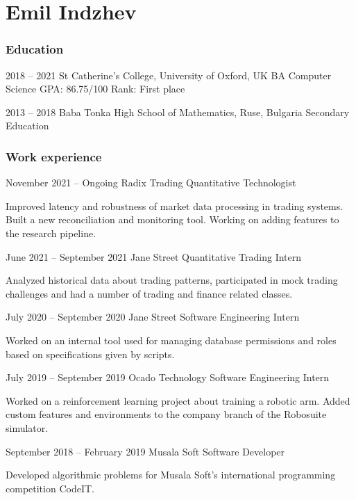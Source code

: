 \documentclass{tccv}
\begin{document}
\part{Emil Indzhev}

\section{Education}

\begin{yearlist}

\item{2018 -- 2021}
     {St Catherine's College, \newline
     University of Oxford, UK}
     {BA Computer Science \newline
     GPA: 86.75/100 \newline
     Rank: First place}

\item{2013 -- 2018}
     {Baba Tonka High School of Mathematics, Ruse, Bulgaria}
     {Secondary Education}

\end{yearlist}

\section{Work experience}

\begin{eventlist}

\item{November 2021 -- Ongoing}
     {Radix Trading}
     {Quantitative Technologist}

Improved latency and robustness of market data processing in trading systems.
Built a new reconciliation and monitoring tool.
Working on adding features to the research pipeline.

\item{June 2021 -- September 2021}
     {Jane Street}
     {Quantitative Trading Intern}

Analyzed historical data about trading patterns,
participated in mock trading challenges and had a number of
trading and finance related classes. 

\item{July 2020 -- September 2020}
     {Jane Street}
     {Software Engineering Intern}

Worked on an internal tool used for managing database permissions and roles
based on specifications given by scripts.

\item{July 2019 -- September 2019}
     {Ocado Technology}
     {Software Engineering Intern}

Worked on a reinforcement learning project about training a robotic arm.
Added custom features and environments to the company branch of the Robosuite simulator.

\item{September 2018 -- February 2019}
     {Musala Soft}
     {Software Developer}

Developed algorithmic problems for Musala Soft's international programming competition CodeIT.

\end{eventlist}
\end{document}
